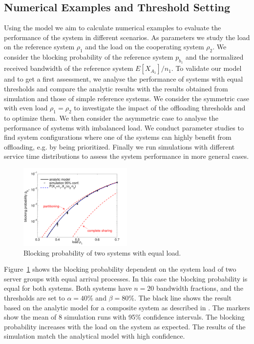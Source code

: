 \subsection{Numerical Examples and Threshold Setting}\label{sec:aggregation:performance_model:numerical_examples}

Using the model we aim to calculate numerical examples to evaluate the performance of the system in different scenarios.
As parameters we study the load on the reference system $\rho_1$ and the load on the cooperating system $\rho_2$.
We consider the blocking probability of the reference system $p_{b_1}$ and the normalized received bandwidth of the reference system $E[X_{A_1}]/n_1$.
To validate our model and to get a first assessment, we analyse the performance of systems with equal thresholds and compare the analytic results with the results obtained from simulation and those of simple reference systems.
We consider the symmetric case with even load $\rho_1=\rho_2$ to investigate the impact of the offloading thresholds and to optimize them.
We then consider the asymmetric case to analyse the performance of systems with imbalanced load.
We conduct parameter studies to find system configurations where one of the systems can highly benefit from offloading, e.g. by being prioritized.
Finally we run simulations with different service time distributions to assess the system performance in more general cases.

\begin{figure}[tb]
	\centering
	\includegraphics[width=0.5\textwidth]{aggregation/performance_model/figures/m2_n20_comp}
 	\caption{Blocking probability of two systems with equal load.}
 	\label{fig:m2_comp}
\end{figure}

Figure~\ref{fig:m2_comp} shows the blocking probability dependent on the system load of two server groups with equal arrival processes.
In this case the blocking probability is equal for both systems. Both systems have $n=20$ bandwidth fractions, and the thresholds are set to $\alpha=40\%$ and $\beta=80\%$.
The black line shows the result based on the analytic model for a composite system as described in .
The markers show the mean of 8 simulation runs with 95\% confidence intervals.
The blocking probability increases with the load on the system as expected.
The results of the simulation match the analytical model with high confidence.

